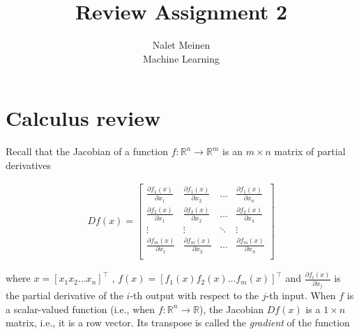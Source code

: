 \documentclass[12pt]{article}
\begin{document}


\title{Review Assignment 2}%
\author{Nalet Meinen \\ %
Machine Learning
}

\maketitle

\section{Calculus review}

Recall that the Jacobian of a function $f : \mathbb{R}^n \rightarrow \mathbb{R}^m$ is an $m \times n$ matrix of partial derivatives 

\begin{align*}
    D f(x) = 
    \begin{bmatrix}
        \frac{\partial f_1(x)}{\partial x_1}    &   \frac{\partial f_1(x)}{\partial x_2}    & \dots     &   \frac{\partial f_1(x)}{\partial x_n}  \\
        \frac{\partial f_2(x)}{\partial x_1}    &   \frac{\partial f_2(x)}{\partial x_2}    & \dots     &   \frac{\partial f_2(x)}{\partial x_3}  \\
        \vdots                                  &   \vdots                                  & \ddots    &   \vdots                                \\   
        \frac{\partial f_m(x)}{\partial x_1}    &   \frac{\partial f_m(x)}{\partial x_2}    & \dots     &   \frac{\partial f_m(x)}{\partial x_n}  \\
    \end{bmatrix}
\end{align*}

\noindent where $ x =[x_1 x_2 \dots x_n]^\intercal$ , $f(x)=[f_1(x) f_2(x) \dots f_m(x)]^\intercal$ and $\frac{\partial f_i(x)}{\partial x_j}$ is the partial derivative of the $i$-th output with respect to the $j$-th input. 
When $f$ is a scalar-valued function (i.e., when $f : \mathbb{R}^n \rightarrow \mathbb{R}$), the Jacobian $Df(x)$ is a $1 \times n$ matrix, i.e., it is a row vector. Its transpose is called the \textit{gradient} of the function 
\end{document}
